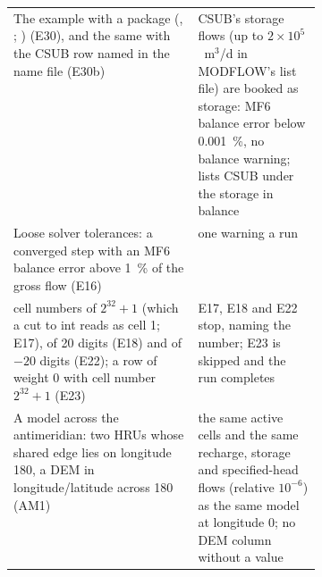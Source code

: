 \begin{table}[!htbp]
\begin{tabularx}{\linewidth}{Y P{0.4\linewidth}}
The example with a  package (, ;  ) (E30), and the same with the CSUB row named  in the name file (E30b) & CSUB's storage flows (up to $2\times10^5$~m$^3$/d in MODFLOW's list file) are booked as storage: MF6 balance error below 0.001~\%, no balance warning;  lists CSUB under the storage in balance\\
Loose solver tolerances: a converged step with an MF6 balance error above 1~\% of the gross flow (E16) & one warning a run\\
 cell numbers of $2^{32}+1$ (which a cut to int reads as cell 1; E17), of 20 digits (E18) and of $-20$ digits (E22); a row of weight 0 with cell number $2^{32}+1$ (E23) & E17, E18 and E22 stop, naming the number; E23 is skipped and the run completes\\
A model across the antimeridian: two HRUs whose shared edge lies on longitude 180, a DEM in longitude/latitude across 180 (AM1) & the same active cells and the same recharge, storage and specified-head flows (relative $10^{-6}$) as the same model at longitude 0; no DEM column without a value\\\bottomrule
\end{tabularx}
\end{table}
